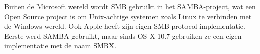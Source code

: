 Buiten de Microsoft wereld wordt SMB gebruikt in het SAMBA-project, wat een Open Source project is om Unix-achtige systemen zoals Linux te verbinden met de Windows-wereld. Ook Apple heeft zijn eigen SMB-protocol implementatie. Eerste werd SAMBA gebruikt, maar sinds OS X 10.7 gebruiken ze een eigen implementatie met de naam SMBX.
